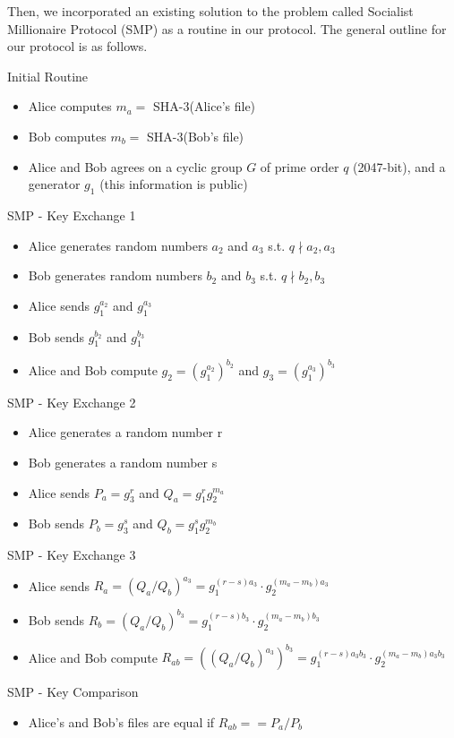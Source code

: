 \documentclass{article}
\begin{document}
Then, we incorporated an existing solution to the problem called Socialist Millionaire
Protocol (SMP) as a routine in our protocol. The general outline for our protocol is as 
follows.


Initial Routine

\begin{itemize}
  \item Alice computes $m_a = $ SHA-3(Alice's file)
  \item Bob computes $m_b = $ SHA-3(Bob's file)
  \item Alice and Bob agrees on a cyclic group $G$ of prime order $q$ (2047-bit), 
    and a generator $g_1$
    (this information is public)
\end{itemize}

SMP - Key Exchange 1
\begin{itemize}
  \item Alice generates random numbers $a_2$ and $a_3$ s.t. $q \nmid a_2, a_3$
  \item Bob generates random numbers $b_2$ and $b_3$ s.t. $q \nmid b_2, b_3$
  \item Alice sends $g_1^{a_2}$ and $g_1^{a_3}$
  \item Bob sends $g_1^{b_2}$ and $g_1^{b_3}$
  \item Alice and Bob compute $g_2 = (g_1^{a_2})^{b_2}$ and $g_3 = (g_1^{a_3})^{b_3}$
\end{itemize}

SMP - Key Exchange 2
\begin{itemize}
  \item Alice generates a random number r
  \item Bob generates a random number s
  \item Alice sends $P_a = g_3^r$ and $Q_a = g_1^rg_2^{m_a}$
  \item Bob sends $P_b = g_3^s$ and $Q_b = g_1^sg_2^{m_b}$
\end{itemize}

SMP - Key Exchange 3
\begin{itemize}
  \item Alice sends $R_a = (Q_a/Q_b)^{a_3} = g_1^{(r-s)a_3}\cdot g_2^{(m_a-m_b)a_3}$
  \item Bob sends $R_b = (Q_a/Q_b)^{b_3} = g_1^{(r-s)b_3}\cdot g_2^{(m_a-m_b)b_3}$
  \item Alice and Bob compute $R_{ab} = ((Q_a/Q_b)^{a_3})^{b_3} = 
  g_1^{(r-s)a_3b_3} \cdot g_2^{(m_a-m_b)a_3b_3}$
\end{itemize}
SMP - Key Comparison
\begin{itemize}
  \item Alice's and Bob's files are equal if $R_{ab} == P_a / P_b$
\end{itemize}
\end{document}
